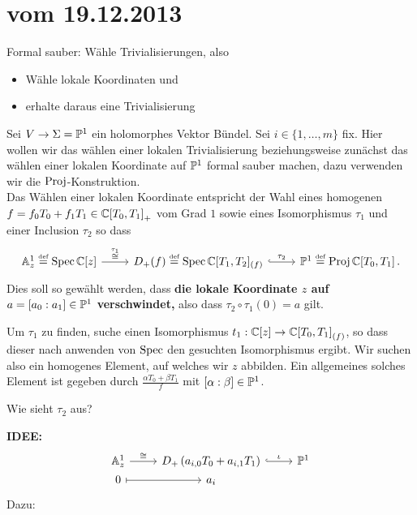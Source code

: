 \section*{vom 19.12.2013}

\begin{ex}
Formal sauber: Wähle Trivialisierungen, also
\begin{itemize}
\item Wähle lokale Koordinaten und
\item erhalte daraus eine Trivialisierung
\end{itemize}
\end{ex}
Sei $V\to\Sigma=\P^1$ ein holomorphes Vektor Bündel.
Sei $i\in\{1,\dots,m\}$ fix.
Hier wollen wir das wählen einer lokalen Trivialisierung beziehungsweise
zunächst das wählen einer lokalen Koordinate auf $\P^1$ formal sauber machen,
dazu verwenden wir die $\Proj$-Konstruktion.\\
Das Wählen einer lokalen Koordinate entspricht der Wahl eines homogenen
$f=f_0T_0+f_1T_1\in\C{[T_0,T_1]}_+$ vom Grad $1$ sowie eines Isomorphismus
$\tau_1$ und einer Inclusion $\tau_2$ so dass
\[ \begin{tikzcd}
\A_z^1\bydef\Spec\C[z] \rar{\overset{\tau_1}\cong} 
  &D_+(f) \bydef \Spec \C[T_1,T_2]_{(f)} \rar[hook]{\tau_2}
  & \P^1 \bydef \Proj\C[T_0,T_1] \,.
\end{tikzcd} \]
Dies soll so gewählt werden, dass \textbf{\boldmath{}die lokale Koordinate $z$
auf $a=[a_{0}:a_{1}]\in\P^1$ verschwindet,} also dass $\tau_2\circ\tau_1(0)=a$
gilt.

Um $\tau_1$ zu finden, suche einen Isomorphismus $t_1:\C[z]\to
\C{[T_0,T_1]}_{(f)}$, so dass dieser nach anwenden von $\Spec$ den gesuchten
Isomorphismus ergibt.
Wir suchen also ein homogenes Element, auf welches wir $z$ abbilden.
Ein allgemeines solches Element ist gegeben durch $\frac{\alpha T_0+\beta
T_1}{f}$ mit $[\alpha:\beta]\in\P^1$.

Wie sieht $\tau_2$ aus?

\begin{comment}
BIS HIER HIN NEU!!
\end{comment}

\textbf{IDEE:}
\[ \begin{tikzcd}[row sep=0]
\A_z^1 \rar{\cong}& D_+\left(a_{i,0}T_0 + a_{i,1}T_1\right) \rar[hook]{\iota}
  & \P^1\\
0 \arrow[|->]{r}& a_i
\end{tikzcd} \]
Dazu:
\begin{comment}
\begin{align*}
D_+\left(a_{i,0}T_0 + a_{i,1}T_1\right)
  &=\Proj \C[T_0,T_1]\Big\backslash
    V_+\Big(\left(a_{i,0}T_0 + a_{i,1}T_1\right)\Big)
\\&\hookrightarrow\P^1
    \qquad \text{~durch~} \qquad a\mapsto a
\end{align*}
\textbf{Fall:} $a=[1:0]$ dann ist $\A^1\cong D_+(T_1)\hookrightarrow \P^1$
durch $x \mapsto (1,z)$
\end{comment}

